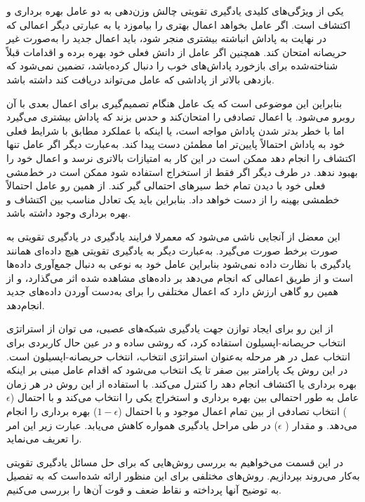 یکی از ویژگی‌های کلیدی یادگیری تقویتی چالش وزن‌دهی به دو عامل بهره برداری و اکتشاف است. اگر عامل بخواهد اعمال بهتری را بیاموزد یا به عبارتی دیگر اعمالی که در نهایت به پاداش انباشته بیشتری منجر شود، باید اعمال جدید را به‌صورت غیر حریصانه امتحان کند. همچنین اگر عامل از دانش فعلی خود بهره برده و اقدامات قبلاً شناخته‌شده برای بازخورد پاداش‌های خوب را دنبال کرده‌باشد، تضمین نمی‌شود که بازدهی بالاتر از پاداشی که عامل می‌تواند دریافت کند داشته باشد.

بنابراین این موضوعی است که یک عامل هنگام تصمیم‌گیری برای اعمال بعدی با آن روبرو می‌شود. یا اعمال تصادفی را امتحان‌کند و حدس بزند که پاداش بیشتری می‌گیرد اما با خطر بدتر شدن پاداش مواجه است، یا اینکه با عملکرد مطابق با شرایط فعلی خود به پاداش احتمالاً پایین‌تر اما مطمئن دست پیدا کند. به‌عبارت دیگر اگر عامل تنها اکتشاف را انجام دهد ممکن است در این کار به امتیازات بالاتری نرسد و اعمال خود را بهبود ندهد. در طرف دیگر اگر فقط از استخراج استفاده شود ممکن است در خط‌مشی فعلی خود با دیدن تمام خط سیرهای احتمالی گیر کند. از همین رو عامل احتمالاً خطمشی بهینه را از دست خواهد داد. بنابراین باید یک تعادل مناسب بین اکتشاف و بهره برداری وجود داشته باشد.

این معضل از آنجایی ناشی می‌شود که معمرلا فرایند یادگیری در یادگیری تقویتی به‌ صورت برخط صورت می‌گیرد. به‌عبارت دیگر به یادگیری تقویتی هیچ داده‌ای همانند یادگیری با نظارت داده نمی‌شود بنابراین عامل خود به‌ نوعی به دنبال جمع‌آوری داده‌ها است و از طریق اعمالی که انجام می‌دهد بر داده‌های مشاهده شده اثر می‌گذارد، و از همین رو گاهی ارزش دارد که اعمال مختلفی را برای به‌دست آوردن داده‌های جدید انجام‌دهد.
 
از این رو برای ایجاد توازن جهت یادگیری شبکه‌های عصبی، می توان از استراتژی انتخاب حریصانه-اپسیلون استفاده کرد، که روشی ساده و در عین حال کاربردی برای انتخاب
عمل در هر مرحله به‌عنوان استراتژی انتخاب، انتخاب حریصانه-اپسیلون است. در این روش یک پارامتر بین صفر تا یک انتخاب می‌شود که اقدام عامل مبنی بر اینکه بهره برداری یا اکتشاف انجام دهد را کنترل می‌کند. با استفاده از این روش در هر زمان عامل به طور احتمالی بین بهره برداری و استخراج یکی را انتخاب می‌کند و با احتمال ($\epsilon$) انتخاب تصادفی از بین تمام اعمال موجود و با احتمال ($1-\epsilon$) بهره برداری را انجام می‌دهد. و مقدار ( $\epsilon$) در طی مراحل یادگیری همواره کاهش می‌یابد. عبارت زیر این امر را تعریف می‌نماید.



در این قسمت می‌خواهیم به بررسی روش‌هایی که برای حل مسائل یادگیری تقویتی به‌کار می‌روند بپردازیم. روش‌های مختلفی برای این منظور ارائه شده‌است که به تفصیل به توضیح آنها پرداخته و نقاط ضعف و قوت آن‌ها را بررسی می‌کنیم.

